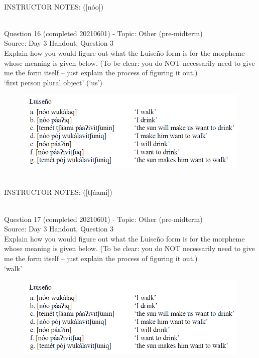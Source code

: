 \documentclass[12pt]{article}
\begin{document}
~\\
INSTRUCTOR NOTES: ([nóo])


~\\

{\large Question 16} (completed 20210601) - Topic: Other (pre-midterm)\\
Source: Day 3 Handout, Question 3\\

Explain how you would figure out what the Luiseño form is for the morpheme whose meaning is given below. (To be clear: you do NOT necessarily need to give me the form itself -- just explain the process of figuring it out.)\\

‘first person plural object’ (‘us’)

\begin{figure}[H]
\includegraphics{../images/luiseno.png}
\end{figure}

~\\
INSTRUCTOR NOTES: ([tʃáami])


~\\

{\large Question 17} (completed 20210601) - Topic: Other (pre-midterm)\\
Source: Day 3 Handout, Question 3\\

Explain how you would figure out what the Luiseño form is for the morpheme whose meaning is given below. (To be clear: you do NOT necessarily need to give me the form itself -- just explain the process of figuring it out.)\\

‘walk’

\begin{figure}[H]
\includegraphics{../images/luiseno.png}
\end{figure}
\end{document}
